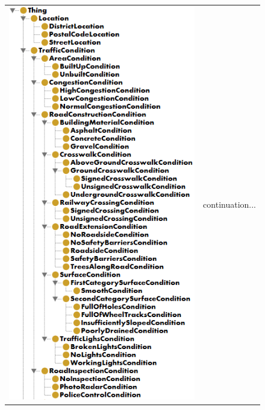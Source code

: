 \begin{figure}[htp]
\centering
\begin{tabular}[t]{ll}
\multirow{2}{*}{\includegraphics[scale=0.7]{images/chapter3/OntologyPart1}} & continuation... \vspace{0.6cm} \\

\end{tabular}
\end{figure}
